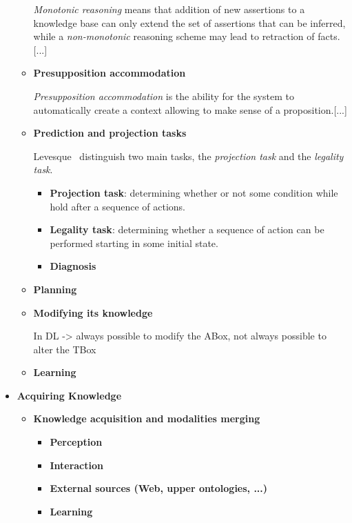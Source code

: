 \documentclass[a4paper]{article}
\begin{document}
\begin{itemize}
\begin{itemize}
        \emph{Monotonic reasoning} means that addition of new assertions to a knowledge base
        can only extend the set of assertions that can be inferred, while a
        \emph{non-monotonic} reasoning scheme may lead to retraction of facts.
        [...]

        \item{\bf Presupposition accommodation}

        \emph{Presupposition accommodation} is the ability for the system to
        automatically create a context allowing to make sense of a proposition.[...]

			\item{\bf Prediction and projection tasks}

			Levesque~\cite{Levesque2008} distinguish two main tasks, the
			\emph{projection task} and the \emph{legality task}.
        
		\begin{itemize} 
		
		\item{\bf Projection task}: determining whether or not
		some condition while hold after a sequence of actions.  
		
		\item{\bf Legality task}: determining whether a sequence of action can be
		performed starting in some initial state.  
		
		\item{\bf Diagnosis}

		\end{itemize}

		\item{\bf Planning}
 
		\item{\bf Modifying its knowledge}

        In DL -> always possible to modify the ABox, not always possible to alter the TBox


        \item{\bf Learning}
    \end{itemize}

    \item{\bf Acquiring Knowledge}

    \begin{itemize}
        \item{\bf Knowledge acquisition and modalities merging}
        \begin{itemize}
            \item{\bf Perception}
            \item{\bf Interaction}
            \item{\bf External sources (Web, upper ontologies, ...)}
            \item{\bf Learning}
        \end{itemize}


\end{itemize}
\end{itemize}
\end{document}
